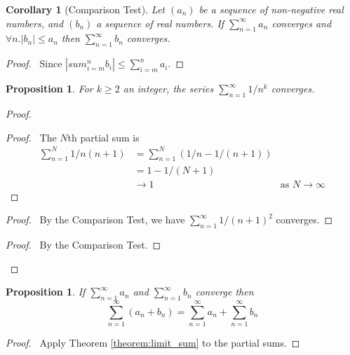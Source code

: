 \documentclass{article}
\let\qed\relax
\newtheorem{proposition}[axiom]{Proposition}
\newtheorem{corollary}{Corollary}[axiom]
\theoremstyle{definition}
\begin{document}
\begin{corollary}[Comparison Test]
    Let $(a_n)$ be a sequence of non-negative real numbers, and $(b_n)$ a sequence of real numbers. If $\sum_{n=1}^\infty a_n$ converges
    and $\forall n. |b_n| \leq a_n$ then $\sum_{n=1}^\infty b_n$ converges.
\end{corollary}

\begin{proof}
    \pf\ Since $|sum_{i=m}^n b_i| \leq \sum_{i=m}^n a_i$. \qed
\end{proof}

\begin{proposition}
    For $k \geq 2$ an integer, the series $\sum_{n=1}^\infty 1/n^k$ converges.
\end{proposition}

\begin{proof}
    \pf
    \begin{proof}
        \pf\ The $N$th partial sum is
        \begin{align*}
            \sum_{n=1}^N 1/n(n+1) & = \sum_{n=1}^N (1/n - 1/(n+1)) \\
            & = 1 - 1/(N+1) \\
            & \rightarrow 1 & \text{as } N \rightarrow \infty
        \end{align*}
    \end{proof}
    \begin{proof}
        \pf\ By the Comparison Test, we have $\sum_{n=1}^\infty 1/(n+1)^2$ converges.
    \end{proof}
    \begin{proof}
        \pf\ By the Comparison Test.
    \end{proof}
    \qed
\end{proof}

\begin{proposition}
    If $\sum_{n=1}^\infty a_n$ and $\sum_{n=1}^\infty b_n$ converge then
    \[ \sum_{n=1}^\infty (a_n + b_n) = \sum_{n=1}^\infty a_n + \sum_{n=1}^\infty b_n \]
\end{proposition}

\begin{proof}
    \pf\ Apply Theorem \ref{theorem:limit_sum} to the partial sums. \qed
\end{proof}
\end{document}
